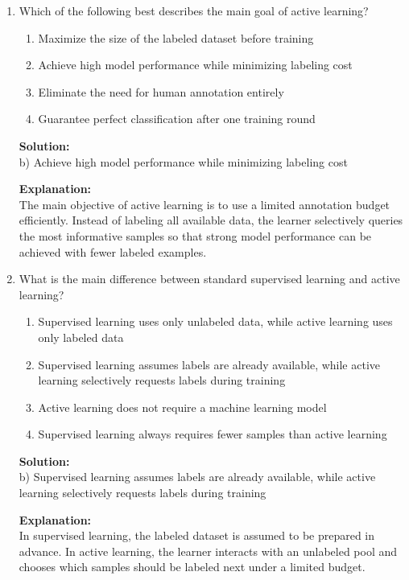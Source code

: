 \documentclass{article}
\begin{document}
\begin{enumerate}

\item Which of the following best describes the main goal of active learning?

\begin{enumerate}
    \item Maximize the size of the labeled dataset before training
    \item Achieve high model performance while minimizing labeling cost
    \item Eliminate the need for human annotation entirely
    \item Guarantee perfect classification after one training round
\end{enumerate}

\textbf{Solution:} \\
b) Achieve high model performance while minimizing labeling cost

\textbf{Explanation:} \\
The main objective of active learning is to use a limited annotation budget efficiently. Instead of labeling all available data, the learner selectively queries the most informative samples so that strong model performance can be achieved with fewer labeled examples.

\vspace{1em}

\item What is the main difference between standard supervised learning and active learning?

\begin{enumerate}
    \item Supervised learning uses only unlabeled data, while active learning uses only labeled data
    \item Supervised learning assumes labels are already available, while active learning selectively requests labels during training
    \item Active learning does not require a machine learning model
    \item Supervised learning always requires fewer samples than active learning
\end{enumerate}

\textbf{Solution:} \\
b) Supervised learning assumes labels are already available, while active learning selectively requests labels during training

\textbf{Explanation:} \\
In supervised learning, the labeled dataset is assumed to be prepared in advance. In active learning, the learner interacts with an unlabeled pool and chooses which samples should be labeled next under a limited budget.


\end{enumerate}
\end{document}
